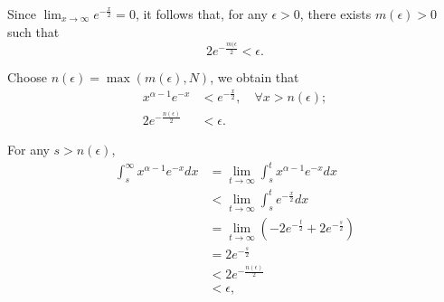 Since $ \lim_{x \rightarrow \infty} e^{-\frac{x}{2}} = 0 $, it follows that,
    for any $ \epsilon > 0 $, there exists $ m(\epsilon) > 0 $ such that
\begin{equation*}
    2 e^{-\frac{m(\epsilon}{2}} < \epsilon.
\end{equation*}

Choose $ n(\epsilon) = \max (m(\epsilon), N) $, we obtain that
\begin{align*}
    x^{\alpha - 1} e^{-x} &< e^{-\frac{x}{2}}, \quad \forall x > n(\epsilon); \\
    2 e^{-\frac{n(\epsilon)}{2}} &< \epsilon.
\end{align*}

For any $ s > n(\epsilon) $,
\begin{align*}
    \int_{s}^{\infty} x^{\alpha - 1} e^{-x} dx
        &= \lim_{t \rightarrow \infty} \int_{s}^{t} x^{\alpha - 1} e^{-x} dx \\
        &< \lim_{t \rightarrow \infty} \int_{s}^{t} e^{-\frac{x}{2}} dx \\
        &= \lim_{t \rightarrow \infty} \left( -2 e^{-\frac{t}{2}} +
            2 e^{-\frac{s}{2}} \right) \\
        &= 2 e^{-\frac{s}{2}} \\
        &< 2 e^{-\frac{n(\epsilon)}{2}} \\
        &< \epsilon,
\end{align*}

